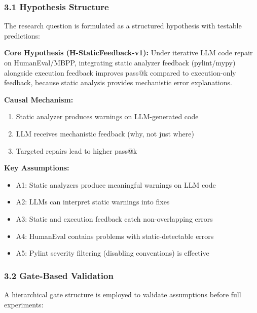 
\subsubsection{3.1 Hypothesis Structure}

The research question is formulated as a structured hypothesis with testable predictions:

\textbf{Core Hypothesis (H-StaticFeedback-v1):} Under iterative LLM code repair on HumanEval/MBPP, integrating static analyzer feedback (pylint/mypy) alongside execution feedback improves pass@k compared to execution-only feedback, because static analysis provides mechanistic error explanations.

\textbf{Causal Mechanism:}

\begin{enumerate}
\item Static analyzer produces warnings on LLM-generated code
\item LLM receives mechanistic feedback (why, not just where)
\item Targeted repairs lead to higher pass@k
\end{enumerate}

\textbf{Key Assumptions:}

\begin{itemize}
\item A1: Static analyzers produce meaningful warnings on LLM code
\item A2: LLMs can interpret static warnings into fixes
\item A3: Static and execution feedback catch non-overlapping errors
\item A4: HumanEval contains problems with static-detectable errors
\item A5: Pylint severity filtering (disabling conventions) is effective
\end{itemize}

\subsubsection{3.2 Gate-Based Validation}

A hierarchical gate structure is employed to validate assumptions before full experiments:

\begin{table}[htbp]
\centering
{}
\end{table}


